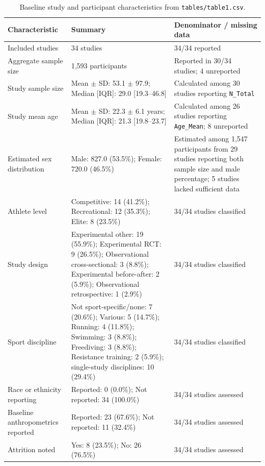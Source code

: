 \begin{table}[H]
\centering
\caption{Baseline study and participant characteristics from \texttt{tables/table1.csv}.}
\label{tab:baseline-characteristics}
\small
\begin{tabularx}{\textwidth}{@{}p{}X p{}@{}}
\toprule
Characteristic & Summary & Denominator / missing data \\
\midrule
Included studies & 34 studies & 34/34 reported \\
Aggregate sample size & 1,593 participants & Reported in 30/34 studies; 4 unreported \\
Study sample size & Mean $\pm$ SD: 53.1 $\pm$ 97.9; Median [IQR]: 29.0 [19.3--46.8] & Calculated among 30 studies reporting \texttt{N\_Total} \\
Study mean age & Mean $\pm$ SD: 22.3 $\pm$ 6.1 years; Median [IQR]: 21.3 [19.8--23.7] & Calculated among 26 studies reporting \texttt{Age\_Mean}; 8 unreported \\
Estimated sex distribution & Male: 827.0 (53.5\%); Female: 720.0 (46.5\%) & Estimated among 1,547 participants from 29 studies reporting both sample size and male percentage; 5 studies lacked sufficient data \\
\addlinespace
Athlete level & Competitive: 14 (41.2\%); Recreational: 12 (35.3\%); Elite: 8 (23.5\%) & 34/34 studies classified \\
Study design & Experimental other: 19 (55.9\%); Experimental RCT: 9 (26.5\%); Observational cross-sectional: 3 (8.8\%); Experimental before-after: 2 (5.9\%); Observational retrospective: 1 (2.9\%) & 34/34 studies classified \\
Sport discipline & Not sport-specific/none: 7 (20.6\%); Various: 5 (14.7\%); Running: 4 (11.8\%); Swimming: 3 (8.8\%); Freediving: 3 (8.8\%); Resistance training: 2 (5.9\%); single-study disciplines: 10 (29.4\%) & 34/34 studies classified \\
\addlinespace
Race or ethnicity reporting & Reported: 0 (0.0\%); Not reported: 34 (100.0\%) & 34/34 studies assessed \\
Baseline anthropometrics reported & Reported: 23 (67.6\%); Not reported: 11 (32.4\%) & 34/34 studies assessed \\
Attrition noted & Yes: 8 (23.5\%); No: 26 (76.5\%) & 34/34 studies assessed \\
\bottomrule
\end{tabularx}
\end{table}
